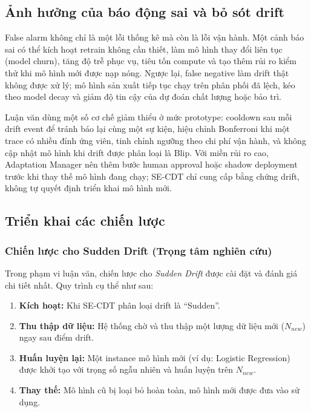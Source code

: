 \subsection{Ảnh hưởng của báo động sai và bỏ sót drift}
\label{sec:false-alarm-impact}

False alarm không chỉ là một lỗi thống kê mà còn là lỗi vận hành. Một cảnh báo sai có thể kích hoạt retrain không cần thiết, làm mô hình thay đổi liên tục (model churn), tăng độ trễ phục vụ, tiêu tốn compute và tạo thêm rủi ro kiểm thử khi mô hình mới được nạp nóng. Ngược lại, false negative làm drift thật không được xử lý; mô hình sản xuất tiếp tục chạy trên phân phối đã lệch, kéo theo model decay và giảm độ tin cậy của dự đoán chất lượng hoặc bảo trì.

Luận văn dùng một số cơ chế giảm thiểu ở mức prototype: cooldown sau mỗi drift event để tránh báo lại cùng một sự kiện, hiệu chỉnh Bonferroni khi một trace có nhiều đỉnh ứng viên, tinh chỉnh ngưỡng theo chi phí vận hành, và không cập nhật mô hình khi drift được phân loại là Blip. Với miền rủi ro cao, Adaptation Manager nên thêm bước human approval hoặc shadow deployment trước khi thay thế mô hình đang chạy; SE-CDT chỉ cung cấp bằng chứng drift, không tự quyết định triển khai mô hình mới.

\subsection{Triển khai các chiến lược}

\subsubsection{Chiến lược cho Sudden Drift (Trọng tâm nghiên cứu)}
Trong phạm vi luận văn, chiến lược cho \textit{Sudden Drift} được cài đặt và đánh giá chi tiết nhất. Quy trình cụ thể như sau:
\begin{enumerate}
	\item \textbf{Kích hoạt:} Khi SE-CDT phân loại drift là ``Sudden''.
	\item \textbf{Thu thập dữ liệu:} Hệ thống chờ và thu thập một lượng dữ liệu mới ($N_{new}$) ngay sau điểm drift.
	\item \textbf{Huấn luyện lại:} Một instance mô hình mới (ví dụ: Logistic Regression) được khởi tạo với trọng số ngẫu nhiên và huấn luyện trên $N_{new}$.
	\item \textbf{Thay thế:} Mô hình cũ bị loại bỏ hoàn toàn, mô hình mới được đưa vào sử dụng.
\end{enumerate}

